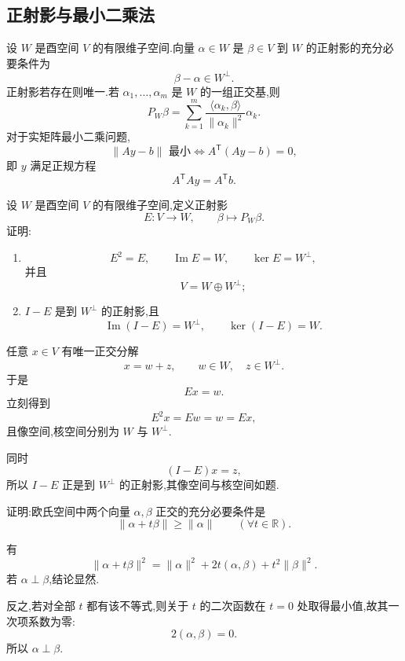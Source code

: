 \subsection{正射影与最小二乘法}

\begin{proposition}[\markstar]
设 $W$ 是酉空间 $V$ 的有限维子空间.向量 $\alpha\in W$ 是 $\beta\in V$ 到 $W$ 的正射影的充分必要条件为
\[
\beta-\alpha\in W^\perp.
\]
正射影若存在则唯一.若 $\alpha_1,\ldots,\alpha_m$ 是 $W$ 的一组正交基,则
\[
P_W\beta
=
\sum\limits_{k=1}^{m}
\dfrac{\langle\alpha_k,\beta\rangle}{\|\alpha_k\|^2}\alpha_k.
\]
对于实矩阵最小二乘问题,
\[
\|Ay-b\|\text{ 最小}
\iff
A^{\mathsf T}(Ay-b)=0,
\]
即 $y$ 满足正规方程
\[
A^{\mathsf T}Ay=A^{\mathsf T}b.
\]
\end{proposition}


\begin{example}
设 $W$ 是酉空间 $V$ 的有限维子空间,定义正射影
\[
E:V\to W,
\qquad
\beta\mapsto P_W\beta.
\]
证明:
\begin{enumerate}
    \item
    \[
    E^2=E,
    \qquad
    \operatorname{Im}E=W,
    \qquad
    \ker E=W^\perp,
    \]
    并且
    \[
    V=W\oplus W^\perp;
    \]
    \item $I-E$ 是到 $W^\perp$ 的正射影,且
    \[
    \operatorname{Im}(I-E)=W^\perp,
    \qquad
    \ker(I-E)=W.
    \]
\end{enumerate}
\end{example}
\exampleblank

\begin{solution}
任意 $x\in V$ 有唯一正交分解
\[
x=w+z,
\qquad
w\in W,
\quad z\in W^\perp.
\]
于是
\[
Ex=w.
\]
立刻得到
\[
E^2x=Ew=w=Ex,
\]
且像空间,核空间分别为 $W$ 与 $W^\perp$.

同时
\[
(I-E)x=z,
\]
所以 $I-E$ 正是到 $W^\perp$ 的正射影,其像空间与核空间如题.
\end{solution}


\begin{example}[\markstar]
证明:欧氏空间中两个向量 $\alpha,\beta$ 正交的充分必要条件是
\[
\|\alpha+t\beta\|\ge\|\alpha\|
\qquad
(\forall t\in\mathbb{R}).
\]
\end{example}
\exampleblank

\begin{solution}
有
\[
\|\alpha+t\beta\|^2
=
\|\alpha\|^2
+2t(\alpha,\beta)
+t^2\|\beta\|^2.
\]
若 $\alpha\perp\beta$,结论显然.

反之,若对全部 $t$ 都有该不等式,则关于 $t$ 的二次函数在 $t=0$ 处取得最小值,故其一次项系数为零:
\[
2(\alpha,\beta)=0.
\]
所以 $\alpha\perp\beta$.
\end{solution}


